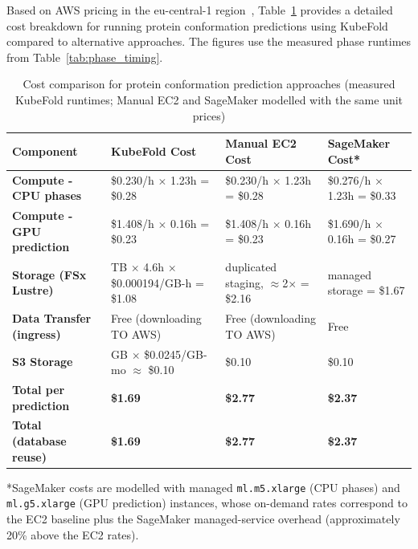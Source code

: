 Based on AWS pricing in the eu-central-1 region~\cite{aws-ec2-pricing,aws-fsx-pricing}, Table~\ref{tab:cost_analysis} provides a detailed cost breakdown for running protein conformation predictions using KubeFold compared to alternative approaches. The figures use the measured phase runtimes from Table~\ref{tab:phase_timing}.

\begin{table}[H]
    \centering
    \caption{Cost comparison for protein conformation prediction approaches (measured KubeFold runtimes; Manual EC2 and SageMaker modelled with the same unit prices)}
    \label{tab:cost_analysis}
    \small
    \begin{tabularx}{\textwidth}{|>{\centering\arraybackslash}X|>{\centering\arraybackslash}X|>{\centering\arraybackslash}X|>{\centering\arraybackslash}X|}
        \hline
        \textbf{Component} & \textbf{KubeFold Cost} & \textbf{Manual EC2 Cost} & \textbf{SageMaker Cost*} \\
        \hline
        \textbf{Compute - CPU phases} & \$0.230/h $\times$ 1.23h = \$0.28 & \$0.230/h $\times$ 1.23h = \$0.28 & \$0.276/h $\times$ 1.23h = \$0.33 \\
        \hline
        \textbf{Compute - GPU prediction} & \$1.408/h $\times$ 0.16h = \$0.23 & \$1.408/h $\times$ 0.16h = \$0.23 & \$1.690/h $\times$ 0.16h = \$0.27 \\
        \hline
        \textbf{Storage (FSx Lustre)} & 1.2 TB $\times$ 4.6h $\times$ \$0.000194/GB-h = \$1.08 & duplicated staging, $\approx$2$\times$ = \$2.16 & managed storage = \$1.67 \\
        \hline
        \textbf{Data Transfer (ingress)} & Free (downloading TO AWS) & Free (downloading TO AWS) & Free \\
        \hline
        \textbf{S3 Storage} & 0.44 GB $\times$ \$0.0245/GB-mo $\approx$ \$0.10 & \$0.10 & \$0.10 \\
        \hline
        \textbf{Total per prediction} & \textbf{\$1.69} & \textbf{\$2.77} & \textbf{\$2.37} \\
        \hline
        \textbf{Total (database reuse)} & \textbf{\$1.69} & \textbf{\$2.77} & \textbf{\$2.37} \\
        \hline
    \end{tabularx}
\end{table}

*SageMaker costs are modelled with managed \texttt{ml.m5.xlarge} (CPU phases) and \texttt{ml.g5.xlarge} (GPU prediction) instances, whose on-demand rates correspond to the EC2 baseline plus the SageMaker managed-service overhead (approximately 20\% above the EC2 rates).


